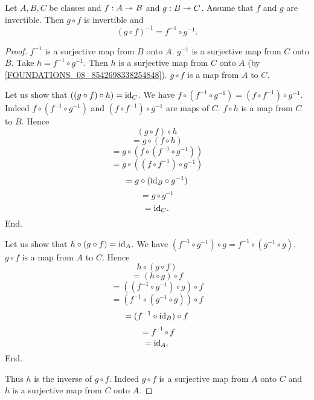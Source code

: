 \documentclass[10pt]{article}
\begin{document}
  \begin{forthel}
    \begin{proposition}
      Let $A, B, C$ be classes and $f : A \twoheadrightarrow B$ and $g : B \twoheadrightarrow C$.
      Assume that $f$ and $g$ are invertible.
      Then $g \circ f$ is invertible and
      \[ (g \circ f)^{-1} = f^{-1} \circ g^{-1}. \]
    \end{proposition}
    \begin{proof}
      $f^{-1}$ is a surjective map from $B$ onto $A$.
      $g^{-1}$ is a surjective map from $C$ onto $B$.
      Take $h = f^{-1} \circ g^{-1}$.
      Then $h$ is a surjective map from $C$ onto $A$
      (by \cref{FOUNDATIONS_08_8542698338254848}).
      $g \circ f$ is a map from $A$ to $C$.

      Let us show that $((g \circ f) \circ h) = \textrm{id}_{C}$.
        We have $f \circ (f^{-1} \circ g^{-1}) = (f \circ f^{-1}) \circ g^{-1}$.
        Indeed $f \circ (f^{-1} \circ g^{-1})$ and
        $(f \circ f^{-1}) \circ g^{-1}$ are maps of $C$.
        $f \circ h$ is a map from $C$ to $B$.
        Hence
        \[  (g \circ f) \circ h                           \]
        \[    = g \circ (f \circ h)                       \]
        \[    = g \circ (f \circ (f^{-1} \circ g^{-1}))   \]
        \[    = g \circ ((f \circ f^{-1}) \circ g^{-1})   \]
        \[    = g \circ (\textrm{id}_{B} \circ g^{-1})            \]
        \[    = g \circ g^{-1}                            \]
        \[    = \textrm{id}_{C}.                                  \]
      End.

      Let us show that $h \circ (g \circ f) = \textrm{id}_{A}$.
        We have $(f^{-1} \circ g^{-1}) \circ g = f^{-1} \circ (g^{-1} \circ g)$.
        $g \circ f$ is a map from $A$ to $C$.
        Hence
        \[  h \circ (g \circ f)                           \]
        \[    = (h \circ g) \circ f                       \]
        \[    = ((f^{-1} \circ g^{-1}) \circ g) \circ f   \]
        \[    = (f^{-1} \circ (g^{-1} \circ g)) \circ f   \]
        \[    = (f^{-1} \circ \textrm{id}_{B}) \circ f            \]
        \[    = f^{-1} \circ f                            \]
        \[    = \textrm{id}_{A}.                                  \]
      End.

      Thus $h$ is the inverse of $g \circ f$.
      Indeed $g \circ f$ is a surjective map from $A$ onto $C$ and $h$ is a
      surjective map from $C$ onto $A$.
    \end{proof}
  \end{forthel}
\end{document}

